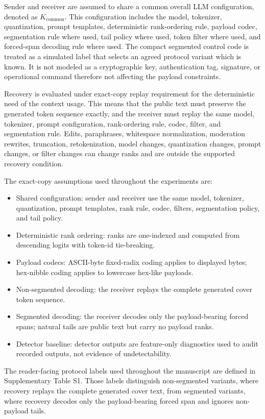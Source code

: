 \documentclass[fleqn,10pt]{wlscirep}
\begin{document}
Sender and receiver are assumed to share a common overall LLM configuration, denoted as \(K_{\mathrm{common}}\). This configuration includes the model, tokenizer, quantization, prompt templates, deterministic rank-ordering rule, payload codec, segmentation rule where used, tail policy where used, token filter where used, and forced-span decoding rule where used. The compact segmented control code is treated as a simulated label that selects an agreed protocol variant which is known. It is not modeled as a cryptographic key, authentication tag, signature, or operational command therefore not affecting the payload constraints.

Recovery is evaluated under exact-copy replay requirement for the deterministic need of the context usage. This means that the public text must preserve the generated token sequence exactly, and the receiver must replay the same model, tokenizer, prompt configuration, rank-ordering rule, codec, filter, and segmentation rule. Edits, paraphrases, whitespace normalization, moderation rewrites, truncation, retokenization, model changes, quantization changes, prompt changes, or filter changes can change ranks and are outside the supported recovery condition.

The exact-copy assumptions used throughout the experiments are:
\begin{itemize}[leftmargin=*]
\item Shared configuration: sender and receiver use the same model, tokenizer, quantization, prompt templates, rank rule, codec, filters, segmentation policy, and tail policy.
\item Deterministic rank ordering: ranks are one-indexed and computed from descending logits with token-id tie-breaking.
\item Payload codecs: ASCII-byte fixed-radix coding applies to displayed bytes; hex-nibble coding applies to lowercase hex-like payloads.
\item Non-segmented decoding: the receiver replays the complete generated cover token sequence.
\item Segmented decoding: the receiver decodes only the payload-bearing forced spans; natural tails are public text but carry no payload ranks.
\item Detector baseline: detector outputs are feature-only diagnostics used to audit recorded outputs, not evidence of undetectability.
\end{itemize}
The reader-facing protocol labels used throughout the manuscript are defined in Supplementary Table S1. Those labels distinguish non-segmented variants, where recovery replays the complete generated cover text, from segmented variants, where recovery decodes only the payload-bearing forced span and ignores non-payload tails.
\end{document}
